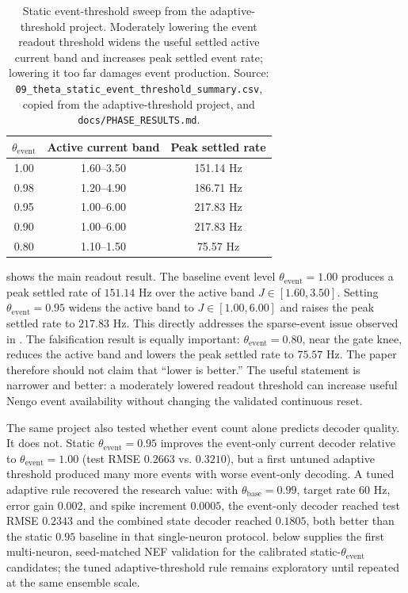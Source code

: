\documentclass[11pt]{article}
\newcommand{\thetaevent}{\theta_{\mathrm{event}}}
\newcommand{\code}[1]{\texttt{#1}}
\begin{document}
\begin{table}[t]
  \centering
  \caption{Static event-threshold sweep from the adaptive-threshold project.
  Moderately lowering the event readout threshold widens the useful settled
  active current band and increases peak settled event rate; lowering it too far
  damages event production. Source:
  \code{09\_theta\_static\_event\_threshold\_summary.csv}, copied from the
  adaptive-threshold project, and \code{docs/PHASE\_RESULTS.md}.}
  \label{tab:theta-static}
  \begin{tabular}{ccc}
    \toprule
    \(\thetaevent\) & Active current band & Peak settled rate \\
    \midrule
    1.00 & 1.60--3.50 & 151.14 Hz \\
    0.98 & 1.20--4.90 & 186.71 Hz \\
    0.95 & 1.00--6.00 & 217.83 Hz \\
    0.90 & 1.00--6.00 & 217.83 Hz \\
    0.80 & 1.10--1.50 & 75.57 Hz \\
    \bottomrule
  \end{tabular}
\end{table}

 shows the main readout result. The baseline event level
\(\thetaevent=1.00\) produces a peak settled rate of \(151.14\) Hz over the
active band \(J\in[1.60,3.50]\). Setting \(\thetaevent=0.95\) widens the active
band to \(J\in[1.00,6.00]\) and raises the peak settled rate to \(217.83\) Hz.
This directly addresses the sparse-event issue observed in
. The falsification result is equally important:
\(\thetaevent=0.80\), near the gate knee, reduces the active band and lowers the
peak settled rate to \(75.57\) Hz. The paper therefore should not claim that
``lower is better.'' The useful statement is narrower and better: a moderately
lowered readout threshold can increase useful Nengo event availability without
changing the validated continuous reset.

The same project also tested whether event count alone predicts decoder
quality. It does not. Static \(\thetaevent=0.95\) improves the event-only
current decoder relative to \(\thetaevent=1.00\) (test RMSE \(0.2663\) vs.
\(0.3210\)), but a first untuned adaptive threshold produced many more events
with worse event-only decoding. A tuned adaptive rule recovered the research
value: with \(\theta_{\mathrm{base}}=0.99\), target rate \(60\) Hz, error gain
\(0.002\), and spike increment \(0.0005\), the event-only decoder reached test
RMSE \(0.2343\) and the combined state decoder reached \(0.1805\), both better
than the static \(0.95\) baseline in that single-neuron protocol.
 below supplies the first multi-neuron,
seed-matched NEF validation for the calibrated static-\(\thetaevent\) candidates;
the tuned adaptive-threshold rule remains exploratory until repeated at the same
ensemble scale.
\end{document}
